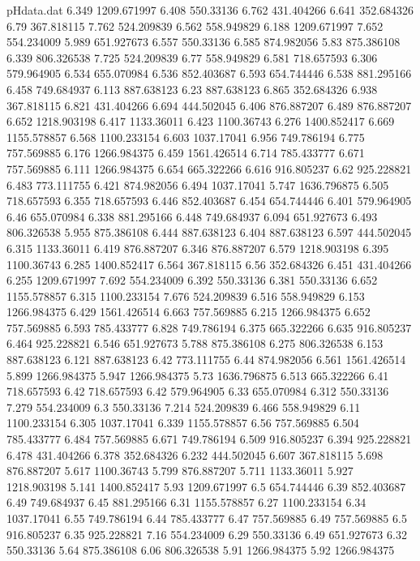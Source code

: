 \begin{filecontents}{pHdata.dat}
6.349	1209.671997
6.408	550.33136
6.762	431.404266
6.641	352.684326
6.79	367.818115
7.762	524.209839
6.562	558.949829
6.188	1209.671997
7.652	554.234009
5.989	651.927673
6.557	550.33136
6.585	874.982056
5.83	875.386108
6.339	806.326538
7.725	524.209839
6.77	558.949829
6.581	718.657593
6.306	579.964905
6.534	655.070984
6.536	852.403687
6.593	654.744446
6.538	881.295166
6.458	749.684937
6.113	887.638123
6.23	887.638123
6.865	352.684326
6.938	367.818115
6.821	431.404266
6.694	444.502045
6.406	876.887207
6.489	876.887207
6.652	1218.903198
6.417	1133.36011
6.423	1100.36743
6.276	1400.852417
6.669	1155.578857
6.568	1100.233154
6.603	1037.17041
6.956	749.786194
6.775	757.569885
6.176	1266.984375
6.459	1561.426514
6.714	785.433777
6.671	757.569885
6.111	1266.984375
6.654	665.322266
6.616	916.805237
6.62	925.228821
6.483	773.111755
6.421	874.982056
6.494	1037.17041
5.747	1636.796875
6.505	718.657593
6.355	718.657593
6.446	852.403687
6.454	654.744446
6.401	579.964905
6.46	655.070984
6.338	881.295166
6.448	749.684937
6.094	651.927673
6.493	806.326538
5.955	875.386108
6.444	887.638123
6.404	887.638123
6.597	444.502045
6.315	1133.36011
6.419	876.887207
6.346	876.887207
6.579	1218.903198
6.395	1100.36743
6.285	1400.852417
6.564	367.818115
6.56	352.684326
6.451	431.404266
6.255	1209.671997
7.692	554.234009
6.392	550.33136
6.381	550.33136
6.652	1155.578857
6.315	1100.233154
7.676	524.209839
6.516	558.949829
6.153	1266.984375
6.429	1561.426514
6.663	757.569885
6.215	1266.984375
6.652	757.569885
6.593	785.433777
6.828	749.786194
6.375	665.322266
6.635	916.805237
6.464	925.228821
6.546	651.927673
5.788	875.386108
6.275	806.326538
6.153	887.638123
6.121	887.638123
6.42	773.111755
6.44	874.982056
6.561	1561.426514
5.899	1266.984375
5.947	1266.984375
5.73	1636.796875
6.513	665.322266
6.41	718.657593
6.42	718.657593
6.42	579.964905
6.33	655.070984
6.312	550.33136
7.279	554.234009
6.3	550.33136
7.214	524.209839
6.466	558.949829
6.11	1100.233154
6.305	1037.17041
6.339	1155.578857
6.56	757.569885
6.504	785.433777
6.484	757.569885
6.671	749.786194
6.509	916.805237
6.394	925.228821
6.478	431.404266
6.378	352.684326
6.232	444.502045
6.607	367.818115
5.698	876.887207
5.617	1100.36743
5.799	876.887207
5.711	1133.36011
5.927	1218.903198
5.141	1400.852417
5.93	1209.671997
6.5	654.744446
6.39	852.403687
6.49	749.684937
6.45	881.295166
6.31	1155.578857
6.27	1100.233154
6.34	1037.17041
6.55	749.786194
6.44	785.433777
6.47	757.569885
6.49	757.569885
6.5	916.805237
6.35	925.228821
7.16	554.234009
6.29	550.33136
6.49	651.927673
6.32	550.33136
5.64	875.386108
6.06	806.326538
5.91	1266.984375
5.92	1266.984375

\end{filecontents}
